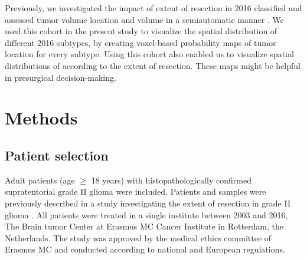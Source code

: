 Previously, we investigated the impact of extent of resection in  2016 classified  and assessed \gls{tumor} volume location and volume in a semiautomatic manner \autocite{wijnenga2017impact}.
We used this cohort in the present study to visualize the spatial distribution of different  2016  subtypes, by creating voxel-based probability maps of \gls{tumor} location for every subtype.
Using this cohort also enabled us to visualize spatial distributions of  according to the extent of resection.
These maps might be helpful in presurgical decision-making.

\section{Methods}
\subsection{Patient selection}
Adult patients (age $\geq$ 18 years) with histopathologically confirmed supratentorial grade II glioma were included.
Patients and samples were previously described in a study investigating the extent of resection in grade II glioma \autocite{wijnenga2017impact}.
All patients were treated in a single institute between 2003 and 2016, The Brain \Gls{tumor} Center at Erasmus MC Cancer Institute in Rotterdam, the Netherlands.
The study was approved by the medical ethics committee of Erasmus MC and conducted according to national and European regulations.

